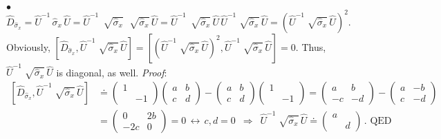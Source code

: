\documentclass[11pt]{article}
\numberwithin{equation}{section} %
\numberwithin{figure}{section} %
\begin{document}
\begin{appendices}
\noindent $\bullet$ $\hat{D}_{\hat{\sigma}_x}=\hat{U}^{-1}\,\hat{\sigma}_x\,\hat{U}= \hat{U}^{-1}\,\sqrt[]{\hat{\sigma}_x}\,\,\sqrt[]{\hat{\sigma}_x}\,\hat{U} = \hat{U}^{-1}\,\sqrt[]{\hat{\sigma}_x}\,\hat{U}\,\hat{U}^{-1}\sqrt[]{\hat{\sigma}_x}\,\hat{U} = (\hat{U}^{-1}\sqrt[]{\hat{\sigma}_x}\,\hat{U})^2$. Obviously, $[\hat{D}_{\hat{\sigma}_x}, \hat{U}^{-1}\sqrt[]{\hat{\sigma}_x}\,\hat{U}]= [(\hat{U}^{-1}\sqrt[]{\hat{\sigma}_x}\,\hat{U})^2, \hat{U}^{-1}\sqrt[]{\hat{\sigma}_x}\,\hat{U}] = 0$. Thus, $\hat{U}^{-1}\sqrt[]{\hat{\sigma}_x}\,\hat{U}$ is diagonal, as well.  \emph{Proof}:
\begin{equation}
\begin{split}
[\hat{D}_{\hat{\sigma}_x}, \hat{U}^{-1}\sqrt[]{\hat{\sigma}_x}\,\hat{U}]
& \doteq \begin{pmatrix}1&\\&-1\end{pmatrix} \begin{pmatrix}a&b\\c&d\end{pmatrix} - \begin{pmatrix}a&b\\c&d\end{pmatrix} \begin{pmatrix}1&\\&-1\end{pmatrix} = \begin{pmatrix}a&b\\-c&-d\end{pmatrix} - \begin{pmatrix}a&-b\\c&-d\end{pmatrix}\\
&= \begin{pmatrix}0&2b\\-2c&0\end{pmatrix} = 0 \,\leftrightarrow \, c,d=0 \,\,\,\Rightarrow \,\,\,  \hat{U}^{-1}\sqrt[]{\hat{\sigma}_x}\,\hat{U} \doteq \begin{pmatrix}a&\\&d\end{pmatrix}\,\textrm{. QED}
\end{split}
\end{equation}


\end{appendices}
\end{document}

